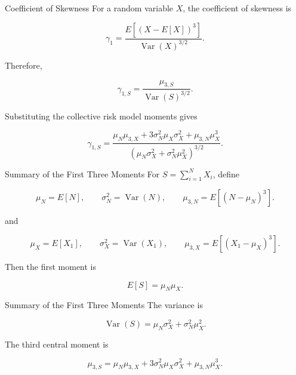 \documentclass[
  ignorenonframetext,
  aspectratio=169,
]{beamer}
\begin{document}
\begin{frame}{Coefficient of Skewness}
\protect{}\label{coefficient-of-skewness}
For a random variable \(X\), the coefficient of skewness is

\[
\gamma_1
=
\frac{E[(X-E[X])^3]}
{\operatorname{Var}(X)^{3/2}}.
\]

Therefore,

\[
\boxed{
\gamma_{1,S}
=
\frac{\mu_{3,S}}
{\operatorname{Var}(S)^{3/2}}
}.
\]

Substituting the collective risk model moments gives

\[
\boxed{
\gamma_{1,S}
=
\frac{
\mu_N\mu_{3,X}
+
3\sigma_N^2\mu_X\sigma_X^2
+
\mu_{3,N}\mu_X^3
}{
\left(
\mu_N\sigma_X^2+\sigma_N^2\mu_X^2
\right)^{3/2}
}
}.
\]
\end{frame}

\begin{frame}{Summary of the First Three Moments}
\protect{}\label{summary-of-the-first-three-moments}
For \(S=\sum_{i=1}^{N}X_i\), define

\[
\mu_N=E[N],\qquad
\sigma_N^2=\operatorname{Var}(N),\qquad
\mu_{3,N}=E[(N-\mu_N)^3].
\]

and

\[
\mu_X=E[X_1],\qquad
\sigma_X^2=\operatorname{Var}(X_1),\qquad
\mu_{3,X}=E[(X_1-\mu_X)^3].
\]

Then the first moment is

\[
\boxed{E[S]=\mu_N\mu_X}.
\]
\end{frame}

\begin{frame}{Summary of the First Three Moments}
\protect{}\label{summary-of-the-first-three-moments-1}
The variance is

\[
\boxed{
\operatorname{Var}(S)
=
\mu_N\sigma_X^2+\sigma_N^2\mu_X^2
}.
\]

The third central moment is

\[
\boxed{
\mu_{3,S}
=
\mu_N\mu_{3,X}
+
3\sigma_N^2\mu_X\sigma_X^2
+
\mu_{3,N}\mu_X^3
}.
\]
\end{frame}
\end{document}
